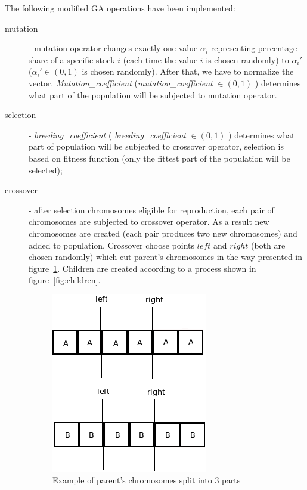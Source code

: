 The following modified GA operations have been implemented:
\begin{description}
  \item [mutation]
      - mutation operator changes exactly one value $ \alpha_{i} $ representing percentage share of a specific stock $i$ (each time the value $i$ is chosen randomly)
      to $\alpha_{i}'$ ($\alpha_{i}' \in (0,1)$ is chosen randomly). 
      After that, we have to normalize the vector.
      \emph{Mutation\_coefficient} (\emph{mutation\_coefficient} $ \in (0,1)$ ) determines what part of the population will be subjected to mutation operator.
  \item [selection]
      - \emph{breeding\_coefficient} ( \emph{breeding\_coefficient} $ \in (0,1)$ ) determines what part of population will be subjected to crossover operator, selection is based on 
      fitness function (only the fittest part of the population will be selected);
  \item [crossover]
      - after selection chromosomes eligible for reproduction, each pair of chromosomes are subjected to crossover operator. As a result new chromosomes are created (each pair
      produces two new chromosomes) and added to population. Crossover choose points $left$  and $right$ (both are chosen randomly) which cut parent's chromosomes in the way
      presented in figure~\ref{fig:parents}. Children are created according to a process shown in figure~\ref{fig:children}.
      
       \begin{figure}[H]
	    \begin{center}
	      \includegraphics[scale=.3]{parents.png}
	    \end{center}
	    \caption{Example of parent's chromosomes split into 3 parts}
	    \label{fig:parents}
	  \end{figure}


\end{description}
